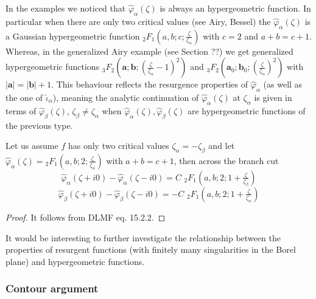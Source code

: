 \documentclass[11pt,a4paper,twoside,leqno,noamsfonts]{amsart}
\numberwithin{equation}{section}
\begin{document}
In the examples we noticed that $\hat{\varphi}_{\alpha}(\zeta)$ is always an hypergeometric function. In particular when there are only two critical values (see Airy, Bessel) the $\hat{\varphi}_{\alpha}(\zeta)$ is a Gaussian hypergeometric function ${}_2F_1\left(a,b;c;\tfrac{\zeta}{\zeta_\alpha}\right)$ with $c=2$ and $a+b=c+1$. Whereas, in the generalized Airy example (see Section ??) we get generalized hypergeometric functions ${}_3F_2\left(\mathbf{a};\mathbf{b};(\tfrac{\zeta}{\zeta_\alpha}-1)^2\right)$ and ${}_3F_2\left(\mathbf{a}_0;\mathbf{b}_0;(\tfrac{\zeta}{\zeta_\alpha})^2\right)$ with $|\mathbf{a}|=|\mathbf{b}|+1$. This behaviour reflects the resurgence properties of $\hat{\varphi}_{\alpha}$ (as well as the one of $\hat
{\iota}_{\alpha}$), meaning the analytic continuation of $\hat{\varphi}_{\alpha}(\zeta)$ at $\zeta_\alpha$ is given in terms of $\hat{\varphi}_{\beta}(\zeta)$, $\zeta_\beta\neq\zeta_\alpha$ when $\hat{\varphi}_{\alpha}(\zeta), \hat{\varphi}_{\beta}(\zeta)$ are hypergeometric functions of the previous type.

\begin{lemma}
Let us assume $f$ has only two critical values $\zeta_\alpha=-\zeta_\beta$ and let $\hat{\varphi}_{\alpha}(\zeta)={}_2F_1(a,b;2;\tfrac{\zeta}{\zeta_\alpha})$ with $a+b=c+1$, then across the branch cut 
\begin{equation}
\hat{\varphi}_{\alpha}(\zeta+i0)-\hat{\varphi}_{\alpha}(\zeta-i0)=C\,\,{}_2F_1\left(a,b;2;1+\tfrac{\zeta}{\zeta_{\beta}}\right)
\end{equation}
\begin{equation}
\hat{\varphi}_{\beta}(\zeta+i0)-\hat{\varphi}_{\beta}(\zeta-i0)=-C\,\,{}_2F_1\left(a,b;2;1+\tfrac{\zeta}{\zeta_{\alpha}}\right)
\end{equation}
\end{lemma}
\begin{proof}
It follows from DLMF eq. 15.2.2. 
\end{proof}

It would be interesting to further investigate the relationship between the properties of resurgent functions (with finitely many singularities in the Borel plane) and hypergeometric functions.   

\subsubsection{Contour argument}
\end{document}
